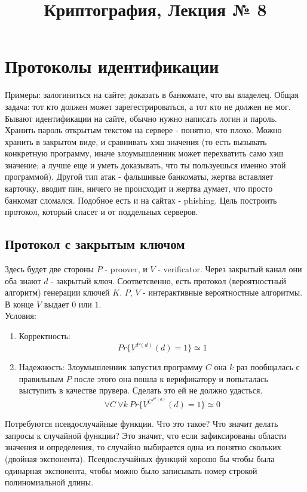 \documentclass[a4paper]{article}
\title{Криптография, Лекция № 8}
\theoremstyle{definition}
\theoremstyle{plain}
\begin{document}
\maketitle

\section{Протоколы идентификации}

Примеры: залогиниться на сайте; доказать в банкомате, что вы владелец. Общая задача:
тот кто должен может зарегестрироваться, а тот кто не должен не мог.
Бывают идентификации на сайте, обычно нужно написать логин и пароль.
Хранить пароль открытым текстом на сервере - понятно, что плохо.
Можно хранить в закрытом виде, и сравнивать хэш значения (то есть вызывать конкретную программу,
иначе злоумышленник может перехватить  само хэш значение; а лучше еще и уметь доказывать, что
ты пользуешься именно этой программой). Другой тип атак - фальшивые банкоматы, жертва вставляет 
карточку, вводит пин, ничего не происходит и жертва думает, что просто банкомат сломался.
Подобное есть и на сайтах - phishing. Цель построить протокол, который спасет и от
поддельных серверов.

\subsection{Протокол с закрытым ключом}

Здесь будет две стороны $P$ - proover, и $V$ - verificator. Через закрытый канал
они оба знают $d$ - закрытый ключ. Соответсвенно, есть протокол (вероятностный алгоритм)
генерации ключей $K$.
 $P$, $V$ - интерактивные вероятностные алгоритмы. В конце $V$ выдает $0$ или $1$.~\\
 
\noindent Условия:
\begin{enumerate}
	\item Корректность:
		$$
			Pr\{V^{P(d)}(d) = 1\} \simeq 1	
		$$
	\item Надежность: Злоумышленник запустил программу $C$ она $k$ раз пообщалась с правильным $P$
		после этого она пошла к верификатору и попыталась выступить в качестве прувера. Сделать это
		ей не должно удасться.
		$$
			\forall C\ \forall k\ Pr\{V^{C^{P^k(d)}}(d) = 1\} \simeq 0		
		$$
\end{enumerate}

\noindent Потребуются псевдослучайные функции. Что это такое? Что значит делать запросы
к случайной функции? Это значит, что если зафиксированы области значения и определения, то случайно
выбирается одна из понятно скольких (двойная экспонента). Псевдослучайных функций хорошо бы
чтобы была одинарная экспонента, чтобы можно было записывать номер строкой полиномиальной длины.
\end{document}
